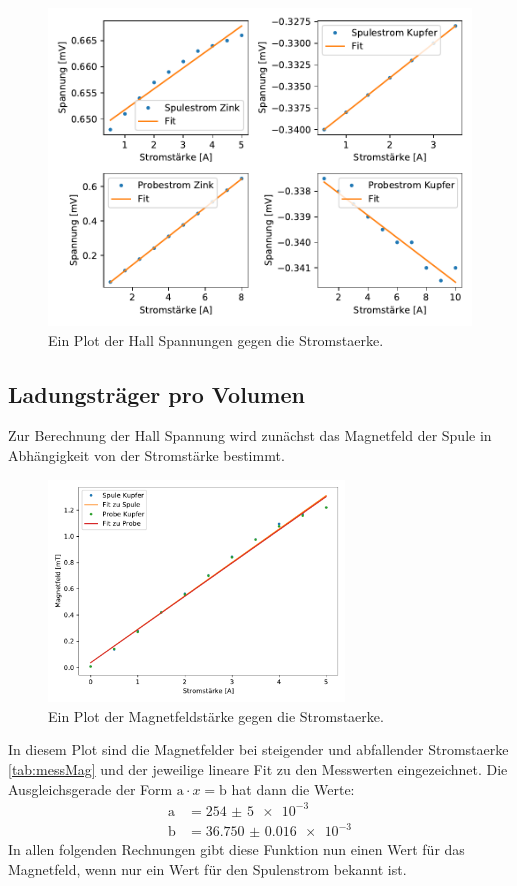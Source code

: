     \begin{figure}[H]
        \centering
        \includegraphics[width=1.1\textwidth]{build/Hall.pdf}
        \caption{Ein Plot der Hall Spannungen gegen die Stromstaerke.}
        \label{img:messHall}
    \end{figure}
    
     
    \subsection{Ladungsträger pro Volumen}
    

    Zur Berechnung der Hall Spannung wird zunächst das Magnetfeld der Spule in Abhängigkeit von der Stromstärke bestimmt.

    \begin{figure}[H]
        \centering
        \includegraphics[width=0.7\textwidth]{build/Magnetfeld.pdf}
        \caption{Ein Plot der Magnetfeldstärke gegen die Stromstaerke.}
        \label{img:Magnetfeld}
    \end{figure}
    \noindent
    In diesem Plot sind die Magnetfelder bei steigender und abfallender Stromstaerke \ref{tab:messMag} und der jeweilige lineare Fit zu den 
    Messwerten eingezeichnet.
    Die Ausgleichsgerade der Form $\text{a}\cdot x = \text{b}$ hat dann die Werte:
    \begin{align}
        \text{a} & = \num{254(5)e-3}\\
        \text{b} & = \num{36.750(16)e-3}
    \end{align}
    In allen folgenden Rechnungen gibt diese Funktion nun einen Wert für das Magnetfeld, wenn nur ein Wert für den Spulenstrom bekannt ist.


